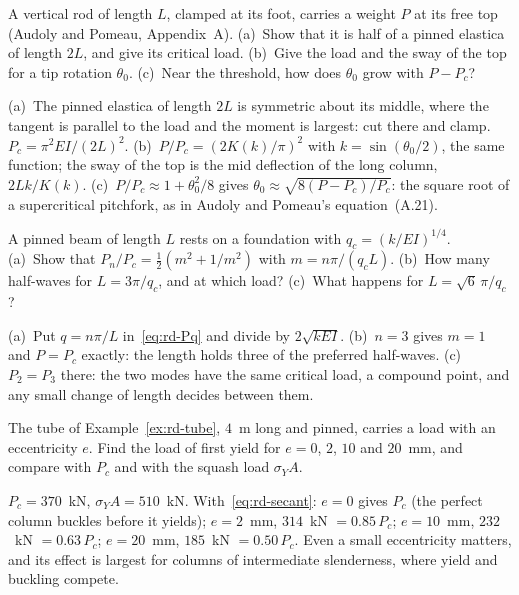 \label{exo:rd-standing}
%
A vertical rod of length $L$, clamped at its foot, carries a weight $P$ at its free top
(Audoly and Pomeau, Appendix~A). (a)~Show that it is half of a pinned elastica of length $2L$, and
give its critical load. (b)~Give the load and the sway of the top for a tip rotation $\theta_0$.
(c)~Near the threshold, how does $\theta_0$ grow with $P - P_c$?
\begin{solution}
(a)~The pinned elastica of length $2L$ is symmetric about its middle, where the tangent is
parallel to the load and the moment is largest: cut there and clamp. $P_c = \pi^2EI/(2L)^2$.
(b)~$P/P_c = (2K(k)/\pi)^2$ with $k = \sin(\theta_0/2)$, the same function; the sway of the top is
the mid deflection of the long column, $2Lk/K(k)$. (c)~$P/P_c \approx 1 + \theta_0^2/8$ gives
$\theta_0 \approx \sqrt{8(P - P_c)/P_c}$: the square root of a supercritical pitchfork, as in Audoly and
Pomeau's equation~(A.21).
\end{solution}

\label{exo:rd-festoon}
%
A pinned beam of length $L$ rests on a foundation with $q_c = (k/EI)^{1/4}$. (a)~Show that
$P_n/P_c = \tfrac12(m^2 + 1/m^2)$ with $m = n\pi/(q_cL)$. (b)~How many half-waves for $L = 3\pi/q_c$, and at
which load? (c)~What happens for $L = \sqrt6\,\pi/q_c$?
\begin{solution}
(a)~Put $q = n\pi/L$ in~\eqref{eq:rd-Pq} and divide by $2\sqrt{kEI}$. (b)~$n = 3$ gives $m = 1$ and
$P = P_c$ exactly: the length holds three of the preferred half-waves. (c)~$P_2 = P_3$ there: the two
modes have the same critical load, a compound point, and any small change of length decides
between them.
\end{solution}

\label{exo:rd-secant}
%
The tube of Example~\ref{ex:rd-tube}, $4$~m long and pinned, carries a load with an
eccentricity $e$. Find the load of first yield for $e = 0$, $2$, $10$ and $20$~mm, and compare with
$P_c$ and with the squash load $\sigma_YA$.
\begin{solution}
$P_c = 370$~kN, $\sigma_YA = 510$~kN. With~\eqref{eq:rd-secant}: $e = 0$ gives $P_c$ (the perfect
column buckles before it yields); $e = 2$~mm, $314$~kN $= 0.85\,P_c$; $e = 10$~mm, $232$~kN $= 0.63\,P_c$;
$e = 20$~mm, $185$~kN $= 0.50\,P_c$. Even a small eccentricity matters, and its effect is largest for columns of
intermediate slenderness, where yield and buckling compete.

\end{solution}

